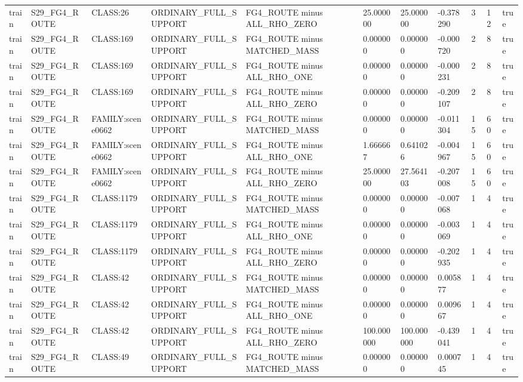\begin{tabular}{lllllllllll}
train & S29\_FG4\_ROUTE & CLASS:26 & ORDINARY\_FULL\_SUPPORT & FG4\_ROUTE minus ALL\_RHO\_ZERO & 25.000000 & 25.000000 & -0.378290 & 3 & 12 & true \\
train & S29\_FG4\_ROUTE & CLASS:169 & ORDINARY\_FULL\_SUPPORT & FG4\_ROUTE minus MATCHED\_MASS & 0.000000 & 0.000000 & -0.000720 & 2 & 8 & true \\
train & S29\_FG4\_ROUTE & CLASS:169 & ORDINARY\_FULL\_SUPPORT & FG4\_ROUTE minus ALL\_RHO\_ONE & 0.000000 & 0.000000 & -0.000231 & 2 & 8 & true \\
train & S29\_FG4\_ROUTE & CLASS:169 & ORDINARY\_FULL\_SUPPORT & FG4\_ROUTE minus ALL\_RHO\_ZERO & 0.000000 & 0.000000 & -0.209107 & 2 & 8 & true \\
train & S29\_FG4\_ROUTE & FAMILY:scene0662 & ORDINARY\_FULL\_SUPPORT & FG4\_ROUTE minus MATCHED\_MASS & 0.000000 & 0.000000 & -0.011304 & 15 & 60 & true \\
train & S29\_FG4\_ROUTE & FAMILY:scene0662 & ORDINARY\_FULL\_SUPPORT & FG4\_ROUTE minus ALL\_RHO\_ONE & 1.666667 & 0.641026 & -0.004967 & 15 & 60 & true \\
train & S29\_FG4\_ROUTE & FAMILY:scene0662 & ORDINARY\_FULL\_SUPPORT & FG4\_ROUTE minus ALL\_RHO\_ZERO & 25.000000 & 27.564103 & -0.207008 & 15 & 60 & true \\
train & S29\_FG4\_ROUTE & CLASS:1179 & ORDINARY\_FULL\_SUPPORT & FG4\_ROUTE minus MATCHED\_MASS & 0.000000 & 0.000000 & -0.007068 & 1 & 4 & true \\
train & S29\_FG4\_ROUTE & CLASS:1179 & ORDINARY\_FULL\_SUPPORT & FG4\_ROUTE minus ALL\_RHO\_ONE & 0.000000 & 0.000000 & -0.003069 & 1 & 4 & true \\
train & S29\_FG4\_ROUTE & CLASS:1179 & ORDINARY\_FULL\_SUPPORT & FG4\_ROUTE minus ALL\_RHO\_ZERO & 0.000000 & 0.000000 & -0.202935 & 1 & 4 & true \\
train & S29\_FG4\_ROUTE & CLASS:42 & ORDINARY\_FULL\_SUPPORT & FG4\_ROUTE minus MATCHED\_MASS & 0.000000 & 0.000000 & 0.005877 & 1 & 4 & true \\
train & S29\_FG4\_ROUTE & CLASS:42 & ORDINARY\_FULL\_SUPPORT & FG4\_ROUTE minus ALL\_RHO\_ONE & 0.000000 & 0.000000 & 0.009667 & 1 & 4 & true \\
train & S29\_FG4\_ROUTE & CLASS:42 & ORDINARY\_FULL\_SUPPORT & FG4\_ROUTE minus ALL\_RHO\_ZERO & 100.000000 & 100.000000 & -0.439041 & 1 & 4 & true \\
train & S29\_FG4\_ROUTE & CLASS:49 & ORDINARY\_FULL\_SUPPORT & FG4\_ROUTE minus MATCHED\_MASS & 0.000000 & 0.000000 & 0.000745 & 1 & 4 & true \\

\end{tabular}
